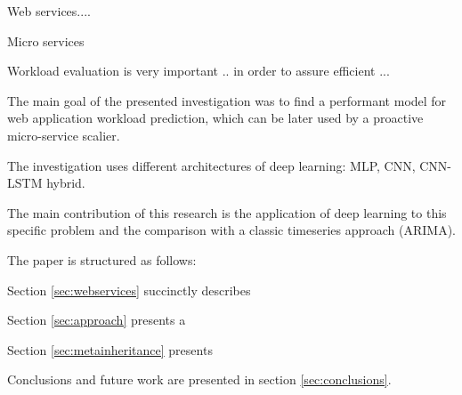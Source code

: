 
Web services....

Micro services

Workload evaluation is very important .. in order to assure efficient ...

The main goal of the presented investigation was to find a performant model for web application workload prediction,
which can be later used by a proactive micro-service scalier. 

The investigation uses different
architectures of deep learning: MLP, CNN, CNN-LSTM hybrid. 



The main
contribution of this research is the application of deep learning to this specific problem
and the comparison with a classic timeseries approach (ARIMA).

The paper is structured as follows:

 Section \ref{sec:webservices} succinctly describes  
 
 
Section \ref{sec:approach} presents a 



Section \ref{sec:metainheritance} presents 


Conclusions and future work are presented in section \ref{sec:conclusions}.